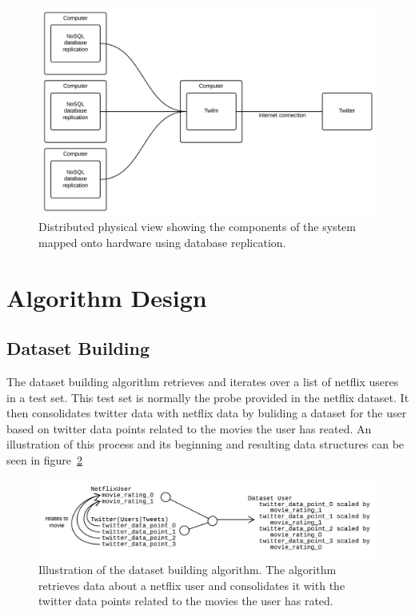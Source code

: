 \begin{figure}[H]
\centerline{\includegraphics[width=4.5in]{image/architecture-physical-view-distributed.png}}
\caption{Distributed physical view showing the components of the system mapped onto hardware using database replication.}
\label{figure:development-view}
\end{figure}

\section{Algorithm Design}
\subsection{Dataset Building}
The dataset building algorithm retrieves and iterates over a list of netflix useres in a test set. This test set is normally the probe provided in the netflix dataset. It then consolidates twitter data with netflix data by buliding a dataset for the user based on twitter data points related to the movies the user has reated. An illustration of this process and its beginning and resulting data structures can be seen in figure~\ref{figure:dataset-building-algorithm}

\begin{figure}[H]
\centerline{\includegraphics[width=6in]{image/design-algorithm-dataset-building.png}}
\caption{Illustration of the dataset building algorithm. The algorithm retrieves data about a netflix user and consolidates it with the twitter data points related to the movies the user has rated.}
\label{figure:dataset-building-algorithm}
\end{figure}

